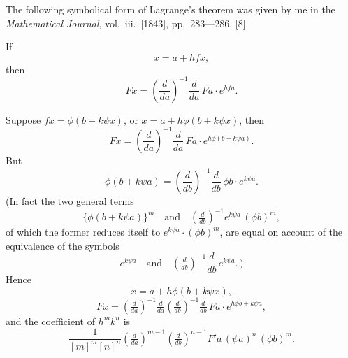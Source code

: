 \documentclass[11pt]{article}
\begin{document}
The following symbolical form of Lagrange's theorem was given by me in the \emph{Mathematical Journal}, vol.\ iii.\ [1843], pp.\ 283---286, [8].

If
\begin{equation}
x = a + h f x,
\end{equation}
then
\[ F x = \left(\frac{d}{da}\right)^{-1}\!\!\frac{d}{da}\, F a \cdot e^{h f a}. \]

Suppose $f x = \phi(b + k \psi x)$, or $x = a + h \phi(b + k \psi x)$, then
\[ F x = \left(\frac{d}{da}\right)^{-1}\!\!\frac{d}{da}\, F a \cdot e^{h \phi(b+k\psi a)}. \]
But
\[ \phi(b + k\psi a) = \left(\frac{d}{db}\right)^{-1}\!\!\frac{d}{db}\,\phi b \cdot e^{k\psi a}. \]
(In fact the two general terms
\[ \{\phi(b + k\psi a)\}^m \quad\text{and}\quad (\tfrac{d}{db})^{-1}\!e^{k\psi a}\,(\phi b)^m, \]
of which the former reduces itself to $e^{k\psi a}\!\cdot\!(\phi b)^m$, are equal on account of the equivalence of the symbols
\[ e^{k\psi a}\quad\text{and}\quad \left(\tfrac{d}{db}\right)^{-1}\!\!\frac{d}{db}\,e^{k\psi a}.\,) \]
Hence
\begin{equation}
x = a + h\phi(b + k\psi x),
\end{equation}
\[ F x = \left(\tfrac{d}{da}\right)^{-1}\!\!\tfrac{d}{da}\left(\tfrac{d}{db}\right)^{-1}\!\!\tfrac{d}{db}\, F a \cdot e^{h\phi b + k\psi a}, \]
and the coefficient of $h^m k^n$ is
\[ \frac{1}{[m]^m[n]^n}\left(\tfrac{d}{da}\right)^{m-1}\!\!\left(\tfrac{d}{db}\right)^{n-1}\!\! F'a\,(\psi a)^n\,(\phi b)^m. \]
\end{document}
